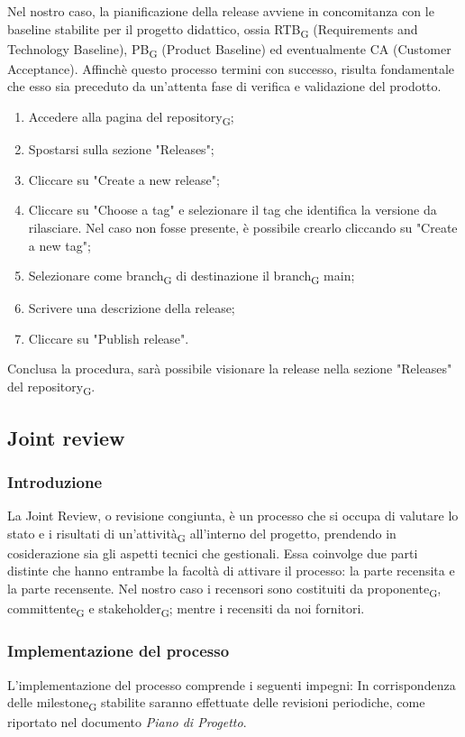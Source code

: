 {{Nel nostro caso, la pianificazione della release avviene in concomitanza con le baseline stabilite per il progetto didattico, ossia 
{RTB\textsubscript{G}} (Requirements and Technology Baseline), 
{PB\textsubscript{G}} (Product Baseline) ed eventualmente CA (Customer Acceptance).
Affinchè questo processo termini con successo, risulta fondamentale che esso sia preceduto da un'attenta fase di verifica e validazione del prodotto.

\begin{enumerate}
    \item Accedere alla pagina del {repository\textsubscript{G}};
    \item Spostarsi sulla sezione "Releases";
    \item Cliccare su "Create a new release";
    \item Cliccare su "Choose a tag" e selezionare il tag che identifica la versione da rilasciare. Nel caso non fosse presente, è possibile
    crearlo cliccando su "Create a new tag";
    \item Selezionare come {branch\textsubscript{G}} di destinazione il {branch\textsubscript{G}} main;
    \item Scrivere una descrizione della release;
    \item Cliccare su "Publish release".
\end{enumerate}
Conclusa la procedura, sarà possibile visionare la release nella sezione "Releases" del {repository\textsubscript{G}}.

\subsection{Joint review}
\subsubsection{Introduzione}
La Joint Review, o revisione congiunta, è un processo che si occupa di valutare lo stato e i risultati di un'{attività\textsubscript{G}}
all'interno del progetto, prendendo in cosiderazione sia gli aspetti tecnici che gestionali. Essa coinvolge due parti distinte che hanno entrambe
la facoltà di attivare il processo: la parte recensita e la parte recensente. Nel nostro caso i recensori sono costituiti da
{proponente\textsubscript{G}}, {committente\textsubscript{G}} e {stakeholder\textsubscript{G}};
mentre i recensiti da noi fornitori.

\subsubsection{Implementazione del processo}
L'implementazione del processo comprende i seguenti impegni:
In corrispondenza delle {milestone\textsubscript{G}} stabilite saranno effettuate delle revisioni periodiche, come riportato nel
documento \textit{Piano di Progetto}.

}}
